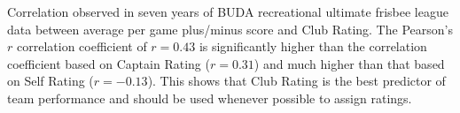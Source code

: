 Correlation observed in seven years of BUDA recreational ultimate frisbee league data between average per game plus/minus score and Club Rating. The Pearson's $r$ correlation coefficient of $r = 0.43$ is significantly higher than the correlation coefficient based on Captain Rating ($r = 0.31$) and much higher than that based on Self Rating ($r = -0.13$). This shows that Club Rating is the best predictor of team performance and should be used whenever possible to assign ratings. \label{fig:correlation_club}